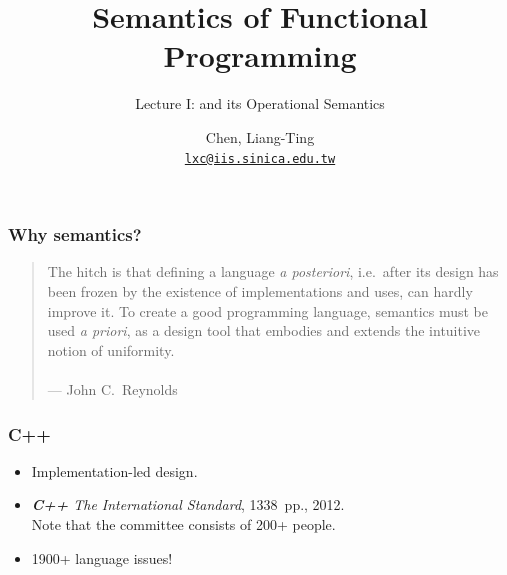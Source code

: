 \title{Semantics of Functional Programming}
\subtitle{Lecture I: \PCF{} and its Operational Semantics}
\author[L.-T. Chen]{Chen, Liang-Ting\\
  \href{mailto:lxc@iis.sinica.edu.tw}{\texttt{lxc@iis.sinica.edu.tw}}}


\setcounter{framenumber}{-1}

\frame{\maketitle}

\begin{frame}[c]
  \frametitle{Why semantics?}
  \begin{quotation}
    The hitch is that defining a language \emph{a posteriori}, i.e.\ after its
    design has been frozen by the existence of implementations and uses, can
    hardly improve it.  To create a good programming language, semantics must
    be used \emph{a priori}, as a design tool that embodies and extends the
    intuitive notion of uniformity. \\~\\
    \hfill --- \textrm{John C.\ Reynolds}
  \end{quotation}
\end{frame}

\begin{frame}[c]
  \frametitle{\protect\textbf{C++}}
  \begin{itemize}
      \item Implementation-led design.
      \item \emph{\textbf{C++} The International Standard},
        \alert{1338~pp.}, 2012. \\
        Note that the committee consists of \alert{200+ people}.
      \item \alert{1900+} language issues!
  \end{itemize}
  \begin{center}
  \end{center}
\end{frame}

